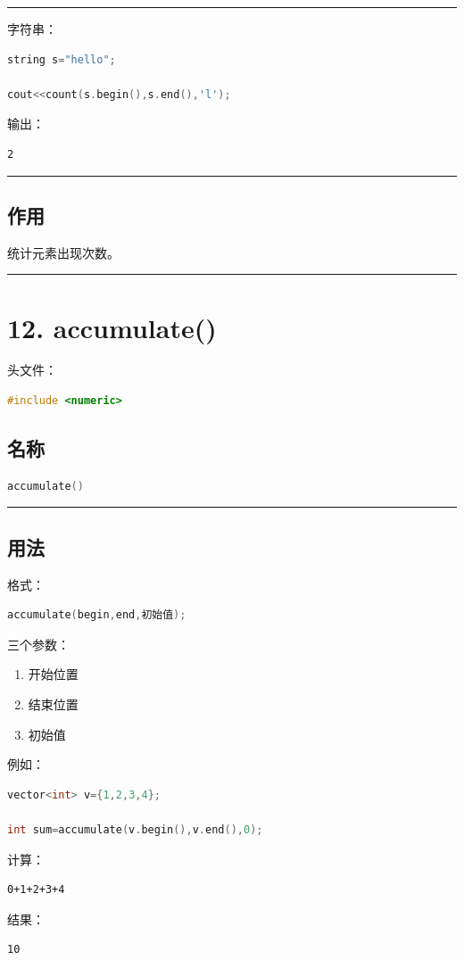 \documentclass[10pt,twocolumn]{extarticle}
\begin{document}
\noindent\rule{\linewidth}{0.4pt}

字符串：
\begin{lstlisting}[language=C++]
string s="hello";

cout<<count(s.begin(),s.end(),'l');
\end{lstlisting}
输出：
\begin{lstlisting}
2
\end{lstlisting}

\noindent\rule{\linewidth}{0.4pt}

\subsection{作用}
统计元素出现次数。

\noindent\rule{\linewidth}{0.4pt}

\section{12. accumulate()}

头文件：
\begin{lstlisting}[language=C++]
#include <numeric>
\end{lstlisting}

\subsection{名称}
\begin{lstlisting}[language=C++]
accumulate()
\end{lstlisting}

\noindent\rule{\linewidth}{0.4pt}

\subsection{用法}
格式：
\begin{lstlisting}[language=C++]
accumulate(begin,end,初始值);
\end{lstlisting}
三个参数：
\begin{enumerate}
    \item 开始位置
    \item 结束位置
    \item 初始值
\end{enumerate}

例如：
\begin{lstlisting}[language=C++]
vector<int> v={1,2,3,4};

int sum=accumulate(v.begin(),v.end(),0);
\end{lstlisting}
计算：
\begin{lstlisting}
0+1+2+3+4
\end{lstlisting}
结果：
\begin{lstlisting}
10
\end{lstlisting}
\end{document}
